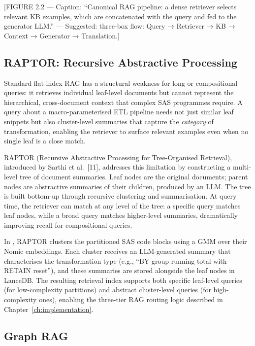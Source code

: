 [FIGURE 2.2 --- Caption: ``Canonical RAG pipeline: a dense retriever selects
relevant KB examples, which are concatenated with the query and fed to the
generator LLM.'' --- Suggested: three-box flow: Query → Retriever → KB →
Context → Generator → Translation.]

\subsection{RAPTOR: Recursive Abstractive Processing}
\label{subsec:raptor-theory}

Standard flat-index \ac{RAG} has a structural weakness for long or compositional
queries: it retrieves individual leaf-level documents but cannot represent the
hierarchical, cross-document context that complex SAS programmes require.
A query about a macro-parameterised ETL pipeline needs not just similar leaf
snippets but also cluster-level summaries that capture the \emph{category} of
transformation, enabling the retriever to surface relevant examples even when
no single leaf is a close match.

\ac{RAPTOR} (Recursive Abstractive Processing for Tree-Organised Retrieval),
introduced by Sarthi et al.~[11], addresses this limitation by constructing a
multi-level tree of document summaries. Leaf nodes are the original documents;
parent nodes are abstractive summaries of their children, produced by an
\ac{LLM}. The tree is built bottom-up through recursive clustering and
summarisation. At query time, the retriever can match at any level of the
tree: a specific query matches leaf nodes, while a broad query matches
higher-level summaries, dramatically improving recall for compositional queries.

In \codara{}, \ac{RAPTOR} clusters the partitioned SAS code blocks using a
\ac{GMM} over their Nomic embeddings. Each cluster receives an
\ac{LLM}-generated summary that characterises the transformation type (e.g.,
``BY-group running total with RETAIN reset''), and these summaries are stored
alongside the leaf nodes in LanceDB. The resulting retrieval index supports
both specific leaf-level queries (for low-complexity partitions) and
abstract cluster-level queries (for high-complexity ones), enabling the three-tier
\ac{RAG} routing logic described in Chapter~\ref{ch:implementation}.

\subsection{Graph RAG}
\label{subsec:graph-rag-theory}

